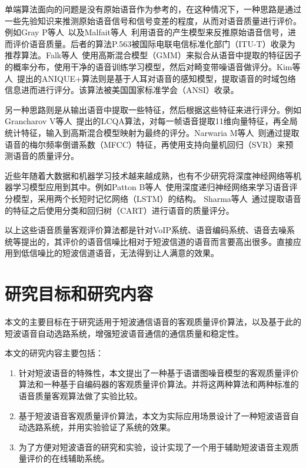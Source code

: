单端算法面向的问题是没有原始语音作为参考的，在这种情况下，一种思路是通过一些先验知识来推测原始语音信号和信号变差的程度，从而对语音质量进行评价。例如Gray P等人~\cite{gray2000non}以及Malfait等人~\cite{malfait2006p}利用语音的产生模型来反推原始语音信号，进而评价语音质量。后者的算法P.563被国际电联电信标准化部门（ITU-T）收录为推荐算法。Falk等人~\cite{falk2006nonintrusive}使用高斯混合模型（GMM）来拟合从语音中提取的特征因子的概率分布，使用干净的语音训练学习模型，然后对畸变带噪语音做评分。Kim等人~\cite{kim2007anique+}提出的ANIQUE+算法则是基于人耳对语音的感知模型，提取语音的时域包络信息进而进行评分。该算法被美国国家标准学会（ANSI）收录。

另一种思路则是从输出语音中提取一些特征，然后根据这些特征来进行评分。例如Grancharov V等人~\cite{grancharov2006low}提出的LCQA算法，对每一帧语音提取11维向量特征，再全局统计特征，输入到高斯混合模型映射为最终的评分。Narwaria M等人~\cite{narwaria2010non}则通过提取语音的梅尔频率倒谱系数（MFCC）特征，再使用支持向量机回归（SVR）来预测语音的质量评分。

近些年随着大数据和机器学习技术越来越成熟，也有不少研究将深度神经网络等机器学习模型应用到其中。例如Patton B等人~\cite{patton2016automos}使用深度递归神经网络来学习语音评分模型，采用两个长短时记忆网络（LSTM）的结构。 Sharma等人~\cite{sharma2016data}通过提取语音的特征之后使用分类和回归树（CART）进行语音的质量评分。

以上这些语音质量客观评价算法都是针对VoIP系统、语音编码系统、语音去噪系统等提出的，其评价的语音信噪比相对于短波信道的语音而言要高出很多。直接应用到低信噪比的短波信道语音，无法得到让人满意的效果。


\section{研究目标和研究内容}

本文的主要目标在于研究适用于短波通信语音的客观质量评价算法，以及基于此的短波语音自动选路系统，增强短波语音通信的通信质量和稳定性。

本文的研究内容主要包括：
\begin{enumerate}
\item 针对短波语音的特殊性，本文提出了一种基于语谱图噪音模型的客观质量评价算法和一种基于自编码器的客观质量评价算法。并将这两种算法和两种标准的语音质量客观算法做了实验比较。
\item 基于短波语音客观质量评价算法，本文为实际应用场景设计了一种短波语音自动选路系统，并用实验验证了系统的效果。
\item 为了方便对短波语音的研究和实验，设计实现了一个用于辅助短波语音主观质量评价的在线辅助系统。
\end{enumerate}

